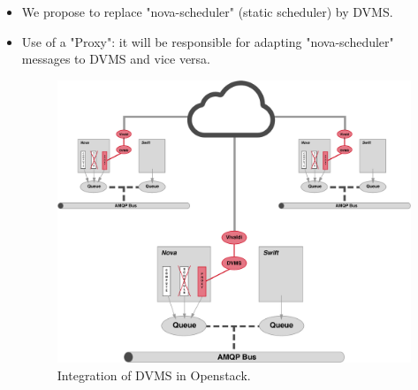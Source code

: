 \begin{itemize}

\item We propose to replace "nova-scheduler" (static scheduler) by DVMS.

\item Use of a "Proxy": it will be responsible for adapting "nova-scheduler" messages to DVMS and vice versa.

\begin{figure}
	\centering
	\includegraphics[width=0.75\linewidth]{Figures/openstack_dvms.pdf}
	\caption{Integration of DVMS in Openstack.}%
	\label{fig:mcd}%
\end{figure}

\end{itemize}